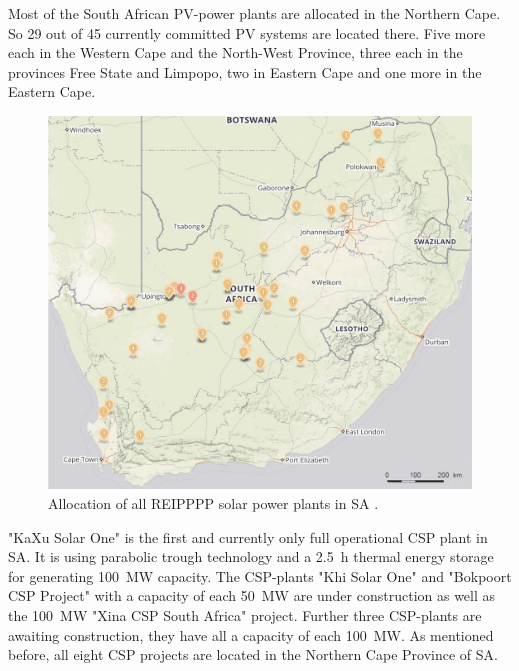 Most of the South African PV-power plants are allocated in the Northern Cape. So 29 out of 45 currently committed PV systems are located there. Five more each in the Western Cape and the North-West Province, three each in the provinces Free State and Limpopo, two in Eastern Cape and one more in the Eastern Cape. \cite{Forder2015}
\pagebreak

\begin{figure}[h!]
\centering
\includegraphics[width=1\linewidth]{FIG/Solar-map}
\caption[Allocation of all REIPPPP solar power plants in SA.]{Allocation of all REIPPPP solar power plants in SA \cite{Forder2015}.}\label{Solar-map}
\end{figure}

"KaXu Solar One" is the first and currently only full operational CSP plant in SA. It is using parabolic trough technology and a 2.5~h thermal energy storage for generating \SI{100}{\mega\watt} capacity. The CSP-plants "Khi Solar One" and "Bokpoort CSP Project" with a capacity of each 50~MW are under construction as well as the \SI{100}{\mega\watt} "Xina CSP South Africa" project. Further three CSP-plants are awaiting construction, they have all a capacity of each \SI{100}{\mega\watt}. As mentioned before, all eight CSP projects are located in the Northern Cape Province of SA. \cite{Forder2015}
\pagebreak
